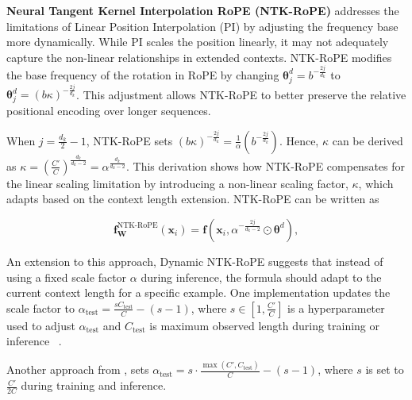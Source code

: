 \documentclass{article}
\begin{document}
\textbf{Neural Tangent Kernel Interpolation RoPE (NTK-RoPE) } addresses the limitations of Linear Position Interpolation (PI) by adjusting the frequency base more dynamically. While PI scales the position linearly, it may not adequately capture the non-linear relationships in extended contexts. NTK-RoPE modifies the base frequency of the rotation in RoPE by changing $\bm{\theta}^d_j = b^{-\frac{2j}{d_k}}$ to $\bm{\theta}^d_j = (b\kappa)^{-\frac{2j}{d_k}}$. This adjustment allows NTK-RoPE to better preserve the relative positional encoding over longer sequences.

When $j= \frac{d_k}{2}-1$, NTK-RoPE sets  $(b\kappa)^{-\frac{2j}{d_k}} = \frac{1}{\alpha} (b^{-\frac{2j}{d_k}})$. Hence, $\kappa$ can be derived as  $\kappa = (\frac{C'}{C})^{\frac{d_k}{d_k-2}} = \alpha^{\frac{d_k}{d_k-2}}$. This derivation shows how NTK-RoPE compensates for the linear scaling limitation by introducing a non-linear scaling factor, $\kappa$, which adapts based on the context length extension. NTK-RoPE can be written as 

\begin{equation}
 \mathbf{f}_\mathbf{W}^{\text{NTK-RoPE}}(\mathbf{x}_i) = \mathbf{f}(\mathbf{x}_i,   \alpha^{-\frac{2j}{d_k-2}} \odot \bm{\theta}^d),
\end{equation}

An extension to this approach, Dynamic NTK-RoPE suggests that instead of using a fixed scale factor $\alpha$ during inference, the formula should adapt to the current context length for a specific example. One implementation updates the scale factor to $\alpha_{\text{test}} = \frac{s C_\text{test}}{C} - (s - 1)$, where $s \in [1, \frac{C'}{C}]$ is a hyperparameter used to adjust $\alpha_{\text{test}}$ and $C_\text{test}$ is maximum observed length during training or inference ~\citep{fu2024data}.

Another approach from \citep{fu2024data}, sets $\alpha_{\text{test}} = s \cdot \frac{\max(C', C_\text{test})}{C}-(s-1)$, where $s$ is set to $\frac{C'}{2C}$ during training and inference.



\end{document}
